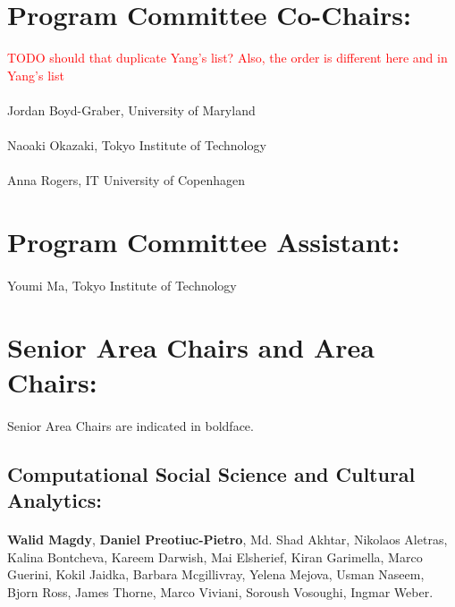 \section*{Program Committee Co-Chairs:}
\textcolor{red}{TODO should that duplicate Yang's list? Also, the order is different here and in Yang's list}
\paragraph{} Jordan Boyd-Graber, University of Maryland
\paragraph{} Naoaki Okazaki, Tokyo Institute of Technology
\paragraph{} Anna Rogers, IT University of Copenhagen

\section*{Program Committee Assistant:}

\paragraph{} Youmi Ma, Tokyo Institute of Technology

\section*{Senior Area Chairs and Area Chairs:}

\paragraph{} Senior Area Chairs are indicated in boldface.

\subsection*{Computational Social Science and Cultural Analytics:}
\paragraph{}\textbf{Walid Magdy}, \textbf{Daniel Preotiuc-Pietro}, Md. Shad Akhtar, Nikolaos Aletras, Kalina Bontcheva, Kareem Darwish, Mai Elsherief, Kiran Garimella, Marco Guerini, Kokil Jaidka, Barbara Mcgillivray, Yelena Mejova, Usman Naseem, Bjorn Ross, James Thorne, Marco Viviani, Soroush Vosoughi, Ingmar Weber.
